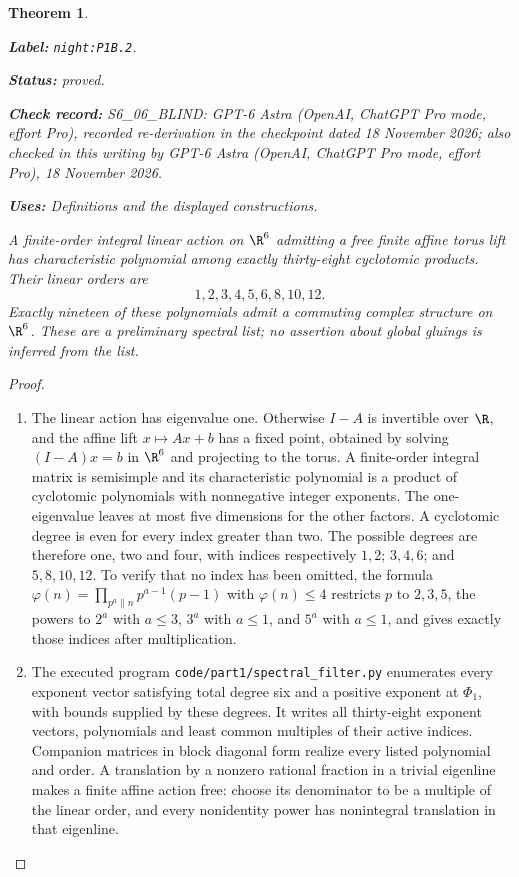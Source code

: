 \documentclass[11pt,a4paper]{article}
\newtheorem{theorem}{Theorem}[section]
\theoremstyle{definition}
\newcommand{\StatementRecord}[4]{\par\smallskip\begingroup\upshape\raggedright\noindent\textbf{Label:} \nolinkurl{#1}.\par\noindent\textbf{Status:} #2.\par\noindent\textbf{Check record:} #3.\par\noindent\textbf{Uses:} #4.\par\endgroup\smallskip}
\newcommand{\CurrentChecker}{GPT-6 Astra (OpenAI, ChatGPT Pro mode, effort Pro), 18 November 2026}
\begin{document}
\begin{theorem}\label{night:P1B.2}
\StatementRecord{night:P1B.2}{proved}{S6\_06\_BLIND: GPT-6 Astra (OpenAI, ChatGPT Pro mode, effort Pro), recorded re-derivation in the checkpoint dated 18 November 2026; also checked in this writing by \CurrentChecker}{Definitions and the displayed constructions}
A finite-order integral linear action on $\R^6$ admitting a
free finite affine torus lift has characteristic polynomial
among exactly thirty-eight cyclotomic products. Their linear
orders are
\[
 1,2,3,4,5,6,8,10,12.
\]
Exactly nineteen of these polynomials admit a commuting complex
structure on $\R^6$. These are a preliminary spectral list;
no assertion about global gluings is inferred from the list.
\end{theorem}
\begin{proof}
\begin{enumerate}[label=\arabic*.]
\item The linear action has eigenvalue one. Otherwise $I-A$ is
invertible over $\R$, and the affine lift $x\mapsto Ax+b$
has a fixed point, obtained by solving $(I-A)x=b$ in $\R^6$
and projecting to the torus. A finite-order integral matrix is
semisimple and its characteristic polynomial is a product of
cyclotomic polynomials with nonnegative integer exponents.
The one-eigenvalue leaves at most five dimensions for the other
factors. A cyclotomic degree is even for every index greater
than two. The possible degrees are therefore one, two and four,
with indices respectively $1,2$; $3,4,6$; and $5,8,10,12$.
To verify that no index has been omitted, the formula
$\varphi(n)=\prod_{p^a\parallel n}p^{a-1}(p-1)$ with
$\varphi(n)\le4$ restricts $p$ to $2,3,5$, the powers to
$2^a$ with $a\le3$, $3^a$ with $a\le1$, and $5^a$ with
$a\le1$, and gives exactly those indices after multiplication.

\item The executed program \texttt{code/part1/spectral\_filter.py}
enumerates every exponent vector satisfying total degree six
and a positive exponent at $\Phi_1$, with bounds supplied by
these degrees. It writes all thirty-eight exponent vectors,
polynomials and least common multiples of their active indices.
Companion matrices in block diagonal form realize every listed
polynomial and order. A translation by a nonzero rational
fraction in a trivial eigenline makes a finite affine action
free: choose its denominator to be a multiple of the linear
order, and every nonidentity power has nonintegral translation
in that eigenline.


\end{enumerate}
\end{proof}
\end{document}
